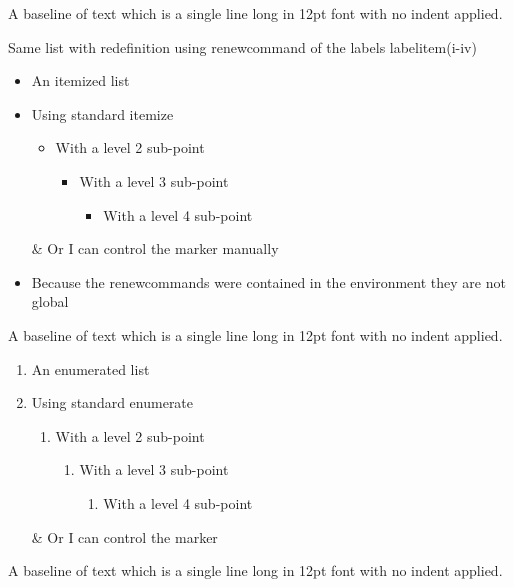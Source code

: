 \documentclass[12pt,a4paper]{article}
\begin{document}
\noindent
A baseline of text which is a single line long in 12pt font with no indent applied.

Same list with redefinition using renewcommand of the labels labelitem(i-iv)
\begin{itemize}
\renewcommand{\labelitemi}{*}
\renewcommand{\labelitemii}{**}
\renewcommand{\labelitemiii}{***}
\renewcommand{\labelitemiv}{****}
\item An itemized list
\item Using standard itemize
\begin{itemize}
\item With a level 2 sub-point
\begin{itemize}
\item With a level 3 sub-point
\begin{itemize}
\item With a level 4 sub-point
\end{itemize}
\end{itemize}
\end{itemize}
\item[\&] Or I can control the marker manually
\end{itemize}

\begin{itemize}
\item Because the renewcommands were contained in the environment they are not global
\end{itemize}

\noindent
A baseline of text which is a single line long in 12pt font with no indent applied.

\begin{enumerate}
\item An enumerated list
\item Using standard enumerate
\begin{enumerate}
\item With a level 2 sub-point
\begin{enumerate}
\item With a level 3 sub-point
\begin{enumerate}
\item With a level 4 sub-point
\end{enumerate}
\end{enumerate}
\end{enumerate}
\item[\&] Or I can control the marker
\end{enumerate}

\noindent
A baseline of text which is a single line long in 12pt font with no indent applied.
\end{document}

